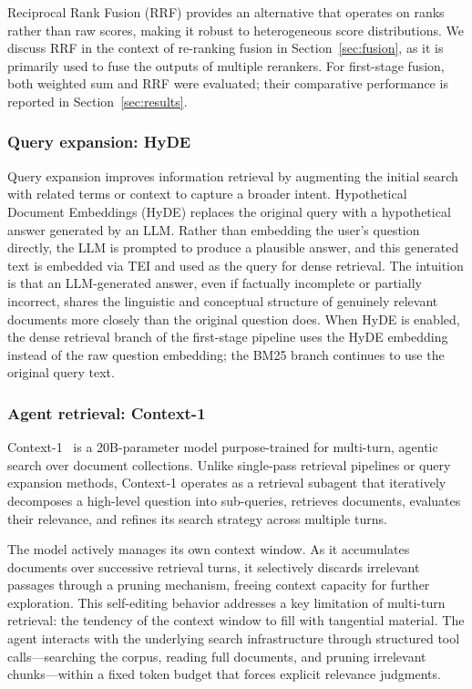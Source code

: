 Reciprocal Rank Fusion (RRF) provides an alternative that operates on ranks rather than raw scores, making it robust to heterogeneous score distributions. We discuss RRF in the context of re-ranking fusion in Section~\ref{sec:fusion}, as it is primarily used to fuse the outputs of multiple rerankers. For first-stage fusion, both weighted sum and RRF were evaluated; their comparative performance is reported in Section~\ref{sec:results}.

\subsubsection{Query expansion: HyDE}
\label{sec:query-expansion}

Query expansion improves information retrieval by augmenting the initial search with related terms or context to capture a broader intent. Hypothetical Document Embeddings (HyDE) replaces the original query with a hypothetical answer generated by an LLM. Rather than embedding the user's question directly, the LLM is prompted to produce a plausible answer, and this generated text is embedded via TEI and used as the query for dense retrieval. The intuition is that an LLM-generated answer, even if factually incomplete or partially incorrect, shares the linguistic and conceptual structure of genuinely relevant documents more closely than the original question does. When HyDE is enabled, the dense retrieval branch of the first-stage pipeline uses the HyDE embedding instead of the raw question embedding; the BM25 branch continues to use the original query text.

\subsubsection{Agent retrieval: Context-1}

Context-1~\cite{context1} is a 20B-parameter model purpose-trained for multi-turn, agentic search over document collections. Unlike single-pass retrieval pipelines or query expansion methods, Context-1 operates as a retrieval subagent that iteratively decomposes a high-level question into sub-queries, retrieves documents, evaluates their relevance, and refines its search strategy across multiple turns.

The model actively manages its own context window. As it accumulates documents over successive retrieval turns, it selectively discards irrelevant passages through a pruning mechanism, freeing context capacity for further exploration. This self-editing behavior addresses a key limitation of multi-turn retrieval: the tendency of the context window to fill with tangential material. The agent interacts with the underlying search infrastructure through structured tool calls---searching the corpus, reading full documents, and pruning irrelevant chunks---within a fixed token budget that forces explicit relevance judgments.

